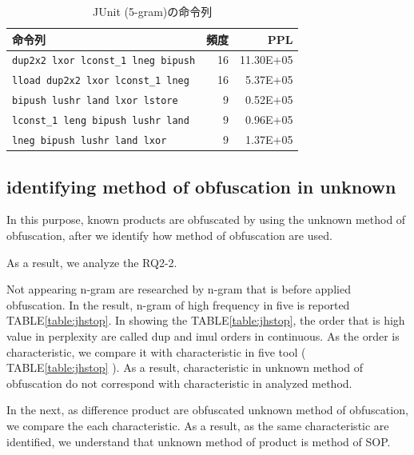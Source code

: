 \documentclass[conference]{IEEEtran}
\begin{document}
\begin{table}[t]
  \centering
  \footnotesize{
    \caption{JUnit (5-gram)の命令列}\label{table:junit}
  \begin{tabular}{l|r|r}
    命令列 & 頻度 & PPL\\ \hline
    \texttt{dup2x2 lxor lconst\_1 lneg bipush}   & 16 & 11.30E+05 \\
    \texttt{lload dup2x2 lxor lconst\_1 lneg}    & 16 &   5.37E+05 \\
    \texttt{bipush lushr land lxor lstore}       &  9 &   0.52E+05 \\
    \texttt{lconst\_1 leng bipush lushr land}    &  9 &   0.96E+05 \\
    \texttt{lneg bipush lushr land lxor}         &  9 &  1.37E+05 \\
  \end{tabular}}
\end{table}

\subsection{identifying method of obfuscation in unknown}
In this purpose, known products are obfuscated by using the unknown method of obfuscation, after we identify how method of obfuscation are used.

As a result, we analyze the RQ2-2.

Not appearing n-gram are researched by n-gram that is before applied obfuscation.
In the result, n-gram of high frequency in five is reported TABLE\ref{table:jhstop}.
In showing the TABLE\ref{table:jhstop}, the order that is high value in perplexity are called dup and imul orders in continuous.
As the order is characteristic, we compare it with characteristic in five tool ( TABLE\ref{table:jhstop} ).
As a result, characteristic in unknown method of obfuscation do not correspond with characteristic in analyzed method.

In the next, as difference product are obfuscated unknown method of obfuscation, we compare the each characteristic.
As a result, as the same characteristic are identified, we understand that unknown method of product is method of SOP.
\end{document}
